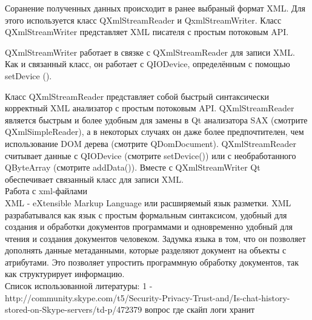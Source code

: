 Соранение полученных данных происходит в ранее выбраный формат XML. Для этого используется класс QXmlStreamReader и QxmlStreamWriter.
Класс QXmlStreamWriter представляет XML писателя с простым потоковым API.

QXmlStreamWriter работает в связке с QXmlStreamReader для записи XML. Как и связанный класс, он работает с QIODevice, определённым с помощью setDevice ().


Класс QXmlStreamReader представляет собой быстрый синтаксически корректный XML анализатор с простым потоковым API.
QXmlStreamReader является быстрым и более удобным для замены в Qt анализатора SAX (смотрите QXmlSimpleReader), а в некоторых случаях он даже более предпочтителен, чем использование DOM дерева (смотрите QDomDocument). QXmlStreamReader считывает данные с QIODevice (смотрите setDevice()) или с необработанного QByteArray (смотрите addData()). Вместе с QXmlStreamWriter Qt обеспечивает связанный класс для записи XML.\\

Работа с xml-файлами \\

XML - eXtensible Markup Language или расширяемый язык разметки. XML разрабатывался как язык с простым формальным синтаксисом, удобный для создания и обработки документов программами и одновременно удобный для чтения и создания документов человеком. Задумка языка в том, что он позволяет дополнять данные метаданными, которые разделяют документ на объекты с атрибутами. Это позволяет упростить программную обработку документов, так как структурирует информацию. \\

Список использованной литературы:
1 -  http://community.skype.com/t5/Security-Privacy-Trust-and/Is-chat-history-stored-on-Skype-servers/td-p/472379 вопрос где скайп логи хранит